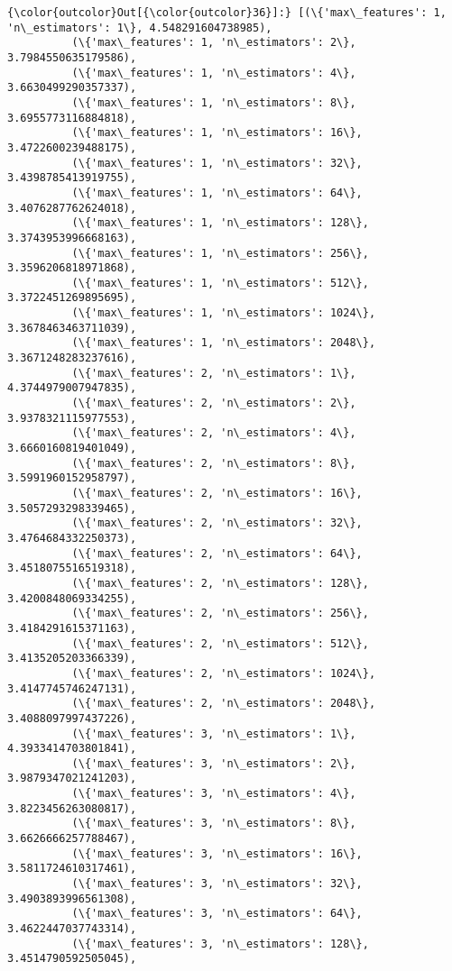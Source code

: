 \documentclass[11pt]{article}
\begin{document}
            \begin{Verbatim}[commandchars=\\\{\}]
{\color{outcolor}Out[{\color{outcolor}36}]:} [(\{'max\_features': 1, 'n\_estimators': 1\}, 4.548291604738985),
          (\{'max\_features': 1, 'n\_estimators': 2\}, 3.7984550635179586),
          (\{'max\_features': 1, 'n\_estimators': 4\}, 3.6630499290357337),
          (\{'max\_features': 1, 'n\_estimators': 8\}, 3.6955773116884818),
          (\{'max\_features': 1, 'n\_estimators': 16\}, 3.4722600239488175),
          (\{'max\_features': 1, 'n\_estimators': 32\}, 3.4398785413919755),
          (\{'max\_features': 1, 'n\_estimators': 64\}, 3.4076287762624018),
          (\{'max\_features': 1, 'n\_estimators': 128\}, 3.3743953996668163),
          (\{'max\_features': 1, 'n\_estimators': 256\}, 3.3596206818971868),
          (\{'max\_features': 1, 'n\_estimators': 512\}, 3.3722451269895695),
          (\{'max\_features': 1, 'n\_estimators': 1024\}, 3.3678463463711039),
          (\{'max\_features': 1, 'n\_estimators': 2048\}, 3.3671248283237616),
          (\{'max\_features': 2, 'n\_estimators': 1\}, 4.3744979007947835),
          (\{'max\_features': 2, 'n\_estimators': 2\}, 3.9378321115977553),
          (\{'max\_features': 2, 'n\_estimators': 4\}, 3.6660160819401049),
          (\{'max\_features': 2, 'n\_estimators': 8\}, 3.5991960152958797),
          (\{'max\_features': 2, 'n\_estimators': 16\}, 3.5057293298339465),
          (\{'max\_features': 2, 'n\_estimators': 32\}, 3.4764684332250373),
          (\{'max\_features': 2, 'n\_estimators': 64\}, 3.4518075516519318),
          (\{'max\_features': 2, 'n\_estimators': 128\}, 3.4200848069334255),
          (\{'max\_features': 2, 'n\_estimators': 256\}, 3.4184291615371163),
          (\{'max\_features': 2, 'n\_estimators': 512\}, 3.4135205203366339),
          (\{'max\_features': 2, 'n\_estimators': 1024\}, 3.4147745746247131),
          (\{'max\_features': 2, 'n\_estimators': 2048\}, 3.4088097997437226),
          (\{'max\_features': 3, 'n\_estimators': 1\}, 4.3933414703801841),
          (\{'max\_features': 3, 'n\_estimators': 2\}, 3.9879347021241203),
          (\{'max\_features': 3, 'n\_estimators': 4\}, 3.8223456263080817),
          (\{'max\_features': 3, 'n\_estimators': 8\}, 3.6626666257788467),
          (\{'max\_features': 3, 'n\_estimators': 16\}, 3.5811724610317461),
          (\{'max\_features': 3, 'n\_estimators': 32\}, 3.4903893996561308),
          (\{'max\_features': 3, 'n\_estimators': 64\}, 3.4622447037743314),
          (\{'max\_features': 3, 'n\_estimators': 128\}, 3.4514790592505045),

\end{Verbatim}
\end{document}

